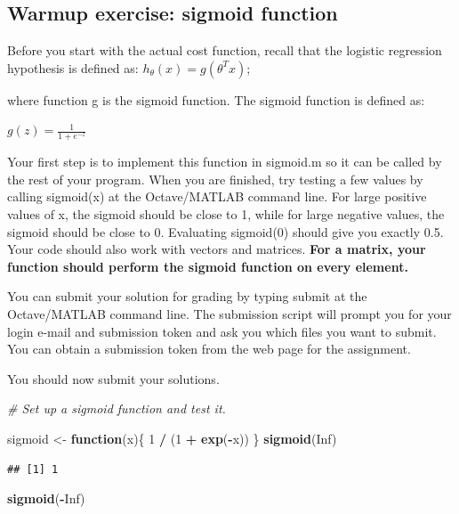 \documentclass[
]{book}
\newenvironment{Shaded}{\begin{snugshade}}{\end{snugshade}}
\newcommand{\CommentTok}[1]{\textcolor[rgb]{0.56,0.35,0.01}{\textit{#1}}}
\newcommand{\ControlFlowTok}[1]{\textcolor[rgb]{0.13,0.29,0.53}{\textbf{#1}}}
\newcommand{\DecValTok}[1]{\textcolor[rgb]{0.00,0.00,0.81}{#1}}
\newcommand{\KeywordTok}[1]{\textcolor[rgb]{0.13,0.29,0.53}{\textbf{#1}}}
\newcommand{\NormalTok}[1]{#1}
\newcommand{\OperatorTok}[1]{\textcolor[rgb]{0.81,0.36,0.00}{\textbf{#1}}}
\newcommand{\OtherTok}[1]{\textcolor[rgb]{0.56,0.35,0.01}{#1}}
\newcommand{\StringTok}[1]{\textcolor[rgb]{0.31,0.60,0.02}{#1}}
\begin{document}
\hypertarget{warmup-exercise-sigmoid-function}{%
\subsection{Warmup exercise: sigmoid function}\label{warmup-exercise-sigmoid-function}}

Before you start with the actual cost function, recall that the logistic regression hypothesis is defined as:
\(h_θ(x) = g(θ^T x)\);

where function g is the sigmoid function. The sigmoid function is defined as:

\(g(z) = \frac{1}{1 + e^{−z}}\)

Your first step is to implement this function in sigmoid.m so it can be called by the rest of your program. When you are finished, try testing a few values by calling sigmoid(x) at the Octave/MATLAB command line. For large positive values of x, the sigmoid should be close to 1, while for large negative values, the sigmoid should be close to 0. Evaluating sigmoid(0) should give you exactly 0.5. Your code should also work with vectors and matrices. \textbf{For a matrix, your function should perform the sigmoid function on every element.}

You can submit your solution for grading by typing submit at the Octave/MATLAB command line. The submission script will prompt you for your login e-mail and submission token and ask you which files you want to submit. You can obtain a submission token from the web page for the assignment.

You should now submit your solutions.

\begin{Shaded}
\begin{Highlighting}[]
\CommentTok{# Set up a sigmoid function and test it.}

\NormalTok{sigmoid <-}\StringTok{ }\ControlFlowTok{function}\NormalTok{(x)\{}
        \DecValTok{1} \OperatorTok{/}\StringTok{ }\NormalTok{(}\DecValTok{1} \OperatorTok{+}\StringTok{ }\KeywordTok{exp}\NormalTok{(}\OperatorTok{-}\NormalTok{x))}
\NormalTok{        \}}
\KeywordTok{sigmoid}\NormalTok{(}\OtherTok{Inf}\NormalTok{)}
\end{Highlighting}
\end{Shaded}

\begin{verbatim}
## [1] 1
\end{verbatim}

\begin{Shaded}
\begin{Highlighting}[]
\KeywordTok{sigmoid}\NormalTok{(}\OperatorTok{-}\OtherTok{Inf}\NormalTok{)}
\end{Highlighting}
\end{Shaded}
\end{document}
